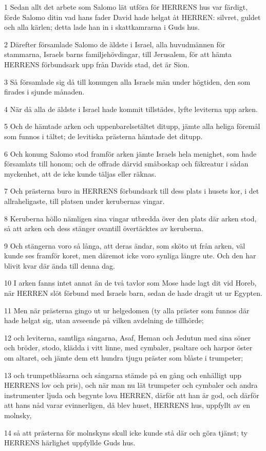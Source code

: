 \par 1 Sedan allt det arbete som Salomo lät utföra för HERRENS hus var färdigt, förde Salomo ditin vad hans fader David hade helgat åt HERREN: silvret, guldet och alla kärlen; detta lade han in i skattkamrarna i Guds hus.
\par 2 Därefter församlade Salomo de äldste i Israel, alla huvudmännen för stammarna, Israels barns familjehövdingar, till Jerusalem, för att hämta HERRENS förbundsark upp från Davids stad, det är Sion.
\par 3 Så församlade sig då till konungen alla Israels män under högtiden, den som firades i sjunde månaden.
\par 4 När då alla de äldste i Israel hade kommit tillstädes, lyfte leviterna upp arken.
\par 5 Och de hämtade arken och uppenbarelsetältet ditupp, jämte alla heliga föremål som funnos i tältet; de levitiska prästerna hämtade det ditupp.
\par 6 Och konung Salomo stod framför arken jämte Israels hela menighet, som hade församlats till honom; och de offrade därvid småboskap och fäkreatur i sådan myckenhet, att de icke kunde täljas eller räknas.
\par 7 Och prästerna buro in HERRENS förbundsark till dess plats i husets kor, i det allraheligaste, till platsen under kerubernas vingar.
\par 8 Keruberna höllo nämligen sina vingar utbredda över den plats där arken stod, så att arken och dess stänger ovantill övertäcktes av keruberna.
\par 9 Och stängerna voro så långa, att deras ändar, som sköto ut från arken, väl kunde ses framför koret, men däremot icke voro synliga längre ute. Och den har blivit kvar där ända till denna dag.
\par 10 I arken fanns intet annat än de två tavlor som Mose hade lagt dit vid Horeb, när HERREN slöt förbund med Israels barn, sedan de hade dragit ut ur Egypten.
\par 11 Men när prästerna gingo ut ur helgedomen (ty alla präster som funnos där hade helgat sig, utan avseende på vilken avdelning de tillhörde;
\par 12 och leviterna, samtliga sångarna, Asaf, Heman och Jedutun med sina söner och bröder, stodo, klädda i vitt linne, med cymbaler, psaltare och harpor öster om altaret, och jämte dem ett hundra tjugu präster som blåste i trumpeter;
\par 13 och trumpetblåsarna och sångarna stämde på en gång och enhälligt upp HERRENS lov och pris), och när man nu lät trumpeter och cymbaler och andra instrumenter ljuda och begynte lova HERREN, därför att han är god, och därför att hans nåd varar evinnerligen, då blev huset, HERRENS hus, uppfyllt av en molnsky,
\par 14 så att prästerna för molnskyns skull icke kunde stå där och göra tjänst; ty HERRENS härlighet uppfyllde Guds hus.

